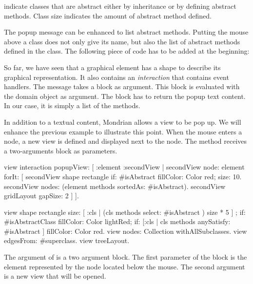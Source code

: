 \documentclass[a4paper,10pt,twoside]{book}
\begin{document}
 indicate classes that are abstract either by inheritance or by defining abstract methods. Class size indicates the amount of abstract method defined. 

The popup message can be enhanced to list abstract methods. Putting the mouse above a class does not only give its name, but also the list of abstract methods defined in the class. The following piece of code has to be added at the beginning:


So far, we have seen that a graphical element has a shape to describe its graphical representation. It also contains an \emph{interaction} that contains event handlers. The message  takes a block as argument. This block is evaluated with the domain object as argument. The block has to return the popup text content. In our case, it is simply a list of the methods.

In addition to a textual content, Mondrian allows a view to be pop up. We will enhance the previous example to illustrate this point. When the mouse enters a node, a new view is defined and displayed next to the node. The method  receives a two-arguments block as parameters. 

\begin{code}{}
view interaction popupView: [ :element :secondView | 
	secondView node: element forIt: [
	  secondView shape rectangle 
	    if: #isAbstract fillColor: Color red;
	    size: 10.  
	  secondView nodes: (element methods sortedAs: #isAbstract).
	  secondView gridLayout gapSize: 2 
	] ].

view shape rectangle
	size: [ :cls | (cls methods select:  #isAbstract ) size * 5 ] ;
	if: #isAbstractClass fillColor: Color lightRed;
	if: [:cls | cls methods anySatisfy: #isAbstract ] fillColor: Color red.
view nodes: Collection withAllSubclasses.
view edgesFrom: #superclass.
view treeLayout.
\end{code}

The argument of  is a two argument block. The first parameter of the block is the element represented by the node located below the mouse. The second argument is a new view that will be opened.
\end{document}

